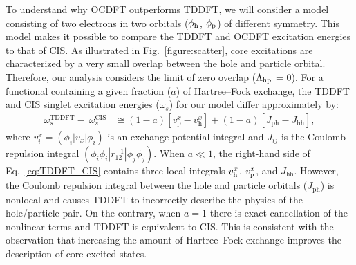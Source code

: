\documentclass{article}
\begin{document}
To understand why OCDFT outperforms TDDFT, we will consider a model consisting of two electrons in two orbitals ($\phi_{\rm h}$, $\phi_{\rm p}$) of different symmetry.\cite{casida_charge-transfer_2000,ziegler_implementation_2012,evangelista_orthogonality_2013}
This model makes it possible to compare the TDDFT and OCDFT excitation energies to that of CIS.
As illustrated in Fig.~\ref{figure:scatter}, core excitations are characterized by a very small overlap between the hole and particle orbital.
Therefore, our analysis considers the limit of zero overlap ($\Lambda_{\rm hp}$ = 0).
For a functional containing a given fraction ($a$) of Hartree--Fock exchange, the TDDFT and CIS singlet excitation energies ($\omega_s$) for our model differ approximately by:
\begin{align}
\label{eq:TDDFT_CIS}
\omega^{\text{TDDFT}}_s - \ \omega^{\text{CIS}}_s &\cong
(1 - a) [v_{\text{p}}^x - v_{\text{h}}^x] +  (1 - a) [J_{\text{ph}} - J_{\text{hh}}]  ,
\end{align}
where $v_{i}^x = (\phi_{i}|v_x|\phi_{i})$ is an exchange potential integral and $J_{ij}$ is the Coulomb repulsion integral $(\phi_i \phi_i|r_{12}^{-1}|\phi_j \phi_j)$. When $a \ll 1$, the right-hand side of Eq.~\ref{eq:TDDFT_CIS} contains three local integrals $v_{\rm h}^x$, $v_{\rm p}^x$, and $J_{\text{hh}}$. However, the Coulomb repulsion integral between the hole and particle orbitals ($J_{\text{ph}}$) is nonlocal and causes TDDFT to incorrectly describe the physics of the hole/particle pair.
On the contrary, when $a=1$ there is exact cancellation of the nonlinear terms and TDDFT is equivalent to CIS.
This is consistent with the observation that increasing the amount of Hartree--Fock exchange improves the description of core-excited states.\cite{heyd_hybrid_2003,nakata_time-dependent_2006,song_core-excitation_2008,henderson_importance_2007,henderson_assessment_2008}
 
\end{document}
